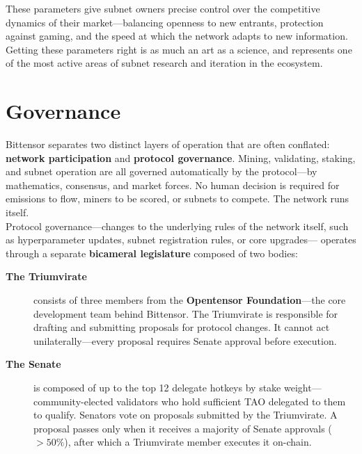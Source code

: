 \documentclass[12pt, a4paper, oneside]{report}
\theoremstyle{definition}
\begin{document}
\noindent These parameters give subnet owners precise control over the 
competitive dynamics of their market—balancing openness to new entrants, 
protection against gaming, and the speed at which the network adapts to 
new information. Getting these parameters right is as much an art as a 
science, and represents one of the most active areas of subnet research 
and iteration in the ecosystem.







\section{Governance}
\label{sec:governance}

Bittensor separates two distinct layers of operation that are often conflated: 
\textbf{network participation} and \textbf{protocol governance}. Mining, 
validating, staking, and subnet operation are all governed automatically by 
the protocol—by mathematics, consensus, and market forces. No human decision 
is required for emissions to flow, miners to be scored, or subnets to compete. 
The network runs itself.\\[0.4cm]

Protocol governance—changes to the underlying rules of the network itself, 
such as hyperparameter updates, subnet registration rules, or core upgrades—
operates through a separate \textbf{bicameral legislature} composed of two 
bodies:

\begin{description}
  \item[\textbf{The Triumvirate}] consists of three members from the 
  \textbf{Opentensor Foundation}—the core development team behind Bittensor. 
  The Triumvirate is responsible for drafting and submitting proposals for 
  protocol changes. It cannot act unilaterally—every proposal requires Senate 
  approval before execution.

  \item[\textbf{The Senate}] is composed of up to the top 12 delegate hotkeys 
  by stake weight—community-elected validators who hold sufficient TAO 
  delegated to them to qualify. Senators vote on proposals submitted by the 
  Triumvirate. A proposal passes only when it receives a majority of Senate 
  approvals (\(>50\%\)), after which a Triumvirate member executes it on-chain.
\end{description}
\end{document}
